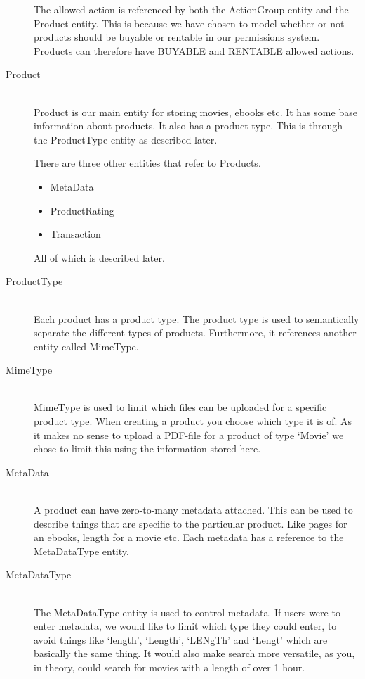 \begin{description}
The allowed action is referenced by both the ActionGroup entity and the Product entity. This is because we have chosen to model whether or not products should be buyable or rentable in our permissions system. Products can therefore have BUYABLE and RENTABLE allowed actions.

\item[Product] \hfill \\ 
Product is our main entity for storing movies, ebooks etc. It has some base information about products. It also has a product type. This is through the ProductType entity as described later.

There are three other entities that refer to Products.
\begin{itemize}
	\item MetaData
	\item ProductRating
	\item Transaction
\end{itemize}
All of which is described later.

\item[ProductType] \hfill \\
Each product has a product type. The product type is used to semantically separate the different types of products. Furthermore, it references another entity called MimeType.

\item[MimeType] \hfill \\
MimeType is used to limit which files can be uploaded for a specific product type. When creating a product you choose which type it is of. As it makes no sense to upload a PDF-file for a product of type `Movie' we chose to limit this using the information stored here.

\item[MetaData] \hfill \\
A product can have zero-to-many metadata attached. This can be used to describe things that are specific to the particular product. Like pages for an ebooks, length for a movie etc. Each metadata has a reference to the MetaDataType entity.

\item[MetaDataType] \hfill \\
The MetaDataType entity is used to control metadata. If users were to enter metadata, we would like to limit which type they could enter, to avoid things like `length', `Length', `LENgTh' and `Lengt' which are basically the same thing. It would also make search more versatile, as you, in theory, could search for movies with a length of over 1 hour.


\end{description}
